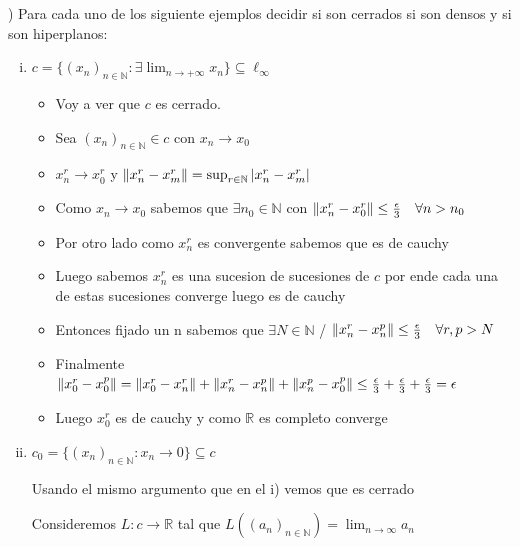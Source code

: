 \documentclass[12pt]{article}
\newcommand{\R}{\mathbb{R}}
\newcommand{\N}{\mathbb{N}}
\newcommand{\ra}{\rightarrow}
\DeclarePairedDelimiter{\norm}{\lVert}{\rVert}
\begin{document}
) Para cada uno de los siguiente ejemplos decidir si son cerrados si son densos y si son hiperplanos:
	\begin{enumerate}[i.]
		\item $c = \{(x_{n})_{n \in \N} : \exists \lim_{n \ra + \infty} x_{n}   \} \subseteq \ell_{\infty}$

			\begin{itemize} 

			\item Voy a ver que $c$ es cerrado.

			\item Sea $(x_{n})_{n \in \N} \in c $ con $x_{n} \ra x_{0}$

			\item $x_{n}^{r} \ra x_{0}^{r}$ y $\norm {x_{n}^{r} - x_{m}^{r}} = \sup_{r \in \N} |x_{n}^{r} - x_{m}^{r}|$
			
			\item Como $x_{n} \ra x_{0}$ sabemos que $\exists n_{0} \in \N $ con $\norm{x_{n}^{r} - x_{0}^{r}} \leq \frac{\epsilon}{3} \quad \forall n>n_{0} $

			\item Por otro lado como $x_{n}^{r}$ es convergente sabemos que es de cauchy

			\item Luego sabemos $x_{n}^{r}$ es una sucesion de sucesiones de $c$ por ende cada una de estas sucesiones converge luego es de cauchy

			\item Entonces fijado un n sabemos que $\exists N \in \N $ / $\norm{x_{n}^{r} - x_{n}^{p}} \leq \frac{\epsilon}{3} \quad \forall r,p > N$

			\item Finalmente $\norm {x_{0}^{r} - x_{0}^{p}} = \norm {x_{0}^{r} - x_{n}^{r} } + \norm {x_{n}^{r} -  x_{n}^{p}} + \norm{x_{n}^{p} - x_{0}^{p}} \leq \frac {\epsilon}{3} + \frac {\epsilon}{3} +  \frac {\epsilon}{3} = \epsilon$

			\item Luego $x_{0}^{r} $ es de cauchy y como $\R$ es completo converge

			\end{itemize}

		\item $c_{0} = \{(x_{n})_{n \in \N} : x_{n} \ra 0 \} \subseteq c$ 

		Usando el mismo argumento que en el i) vemos que es cerrado

			Consideremos $L:c \ra \R$ tal que $L((a_{n})_{n \in \N}) = \lim_{n \ra \infty} a_{n}$


\end{enumerate}
\end{document}
